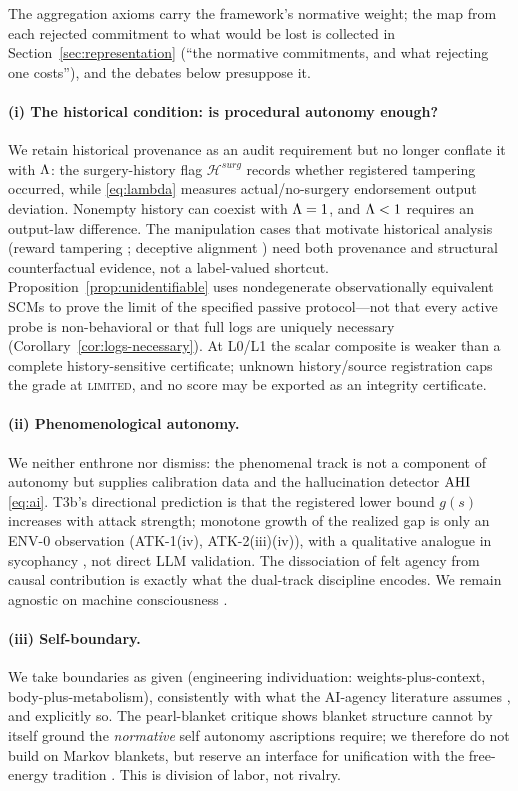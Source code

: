 The aggregation axioms carry the framework's normative weight; the map from
each rejected commitment to what would be lost is collected in
Section~\ref{sec:representation} (``the normative commitments, and what
rejecting one costs''), and the debates below presuppose it.

\paragraph{(i) The historical condition: is procedural autonomy enough?}
We retain historical provenance as an audit requirement but no longer conflate
it with $\Lambda$: the surgery-history flag $\mathcal H^{surg}$ records whether
registered tampering occurred, while \eqref{eq:lambda} measures
actual/no-surgery endorsement output deviation. Nonempty history can coexist
with $\Lambda=1$, and $\Lambda<1$ requires an output-law difference. The
manipulation cases that motivate historical analysis (reward tampering
\citep{everitt2021}; deceptive alignment \citep{hubinger2019}) need both
provenance and structural counterfactual evidence, not a label-valued
shortcut. Proposition~\ref{prop:unidentifiable} uses nondegenerate
observationally equivalent SCMs to prove the limit of the specified passive
protocol---not that every active probe is non-behavioral or that full logs
are uniquely necessary (Corollary~\ref{cor:logs-necessary}). At L0/L1 the
scalar composite is weaker than a complete history-sensitive certificate;
unknown history/source registration caps the grade at \textsc{limited}, and
no score may be exported as an integrity certificate.

\paragraph{(ii) Phenomenological autonomy.} We neither enthrone nor dismiss:
the phenomenal track is not a component of autonomy but supplies calibration
data and the hallucination detector $\mathrm{AHI}$ \eqref{eq:ai}. T3b's directional
prediction is that the registered lower bound $g(s)$ increases with attack
strength; monotone growth of the realized gap is only an ENV-0 observation
(ATK-1(iv), ATK-2(iii)(iv)), with a qualitative analogue in sycophancy
\citep{sharma2023}, not direct LLM validation. The dissociation of felt agency
from causal contribution \citep{moore_obhi2012} is exactly what the dual-track
discipline encodes. We remain agnostic on machine consciousness
\citep{chalmers2023,butlin2023,long2024}.

\paragraph{(iii) Self-boundary.} We take boundaries as given (engineering
individuation: weights-plus-context, body-plus-metabolism), consistently with
what the AI-agency literature assumes \citep{dung2024,kasirzadeh2025,feng2025},
and explicitly so. The pearl-blanket critique \citep{bruineberg2022} shows
blanket structure cannot by itself ground the \emph{normative} self autonomy
ascriptions require; we therefore do not build on Markov blankets, but reserve
an interface for unification with the free-energy tradition
\citep{friston2010,friston2023}. This is division of labor, not rivalry.

